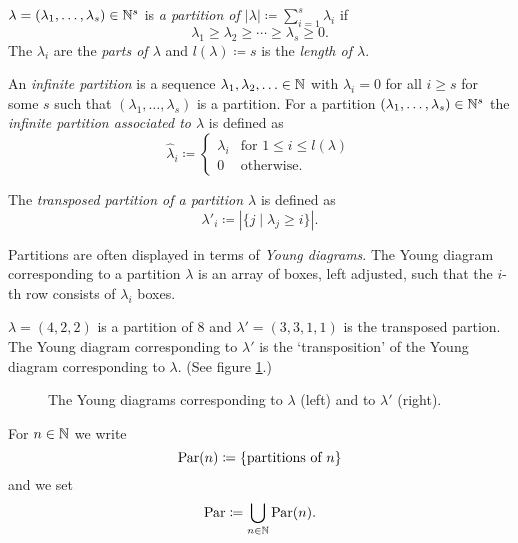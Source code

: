 \begin{defi}
  $\lambda = (\lambda_1, \dotsc, \lambda_s) \in \mathbb{N}^s$ is \emph{a partition of $|\lambda| \coloneqq \sum_{i=1}^s \lambda_i$} if
  \[
          \lambda_1
    \geq  \lambda_2
    \geq  \dotsb
    \geq  \lambda_s
    \geq  0.
  \]
  The $\lambda_i$ are the \emph{parts of $\lambda$} and $l(\lambda) \coloneqq s$ is the \emph{length of $\lambda$}.
  
  An \emph{infinite partition} is a sequence $\lambda_1, \lambda_2, \dotsc \in \mathbb{N}$ with $\lambda_i = 0$ for all $i \geq s$ for some $s$ such that $(\lambda_1, \dotsc, \lambda_s)$ is a partition.
  For a partition $(\lambda_1, \dotsc, \lambda_s) \in \mathbb{N}^s$ the \emph{infinite partition associated to $\lambda$} is defined as
  \[
              \hat{\lambda}_i
    \coloneqq \begin{cases}
                \lambda_i & \text{for } 1 \leq i \leq l(\lambda) \\
                        0 & \text{otherwise}.
              \end{cases}
  \]
  
  The \emph{transposed partition of a partition $\lambda$} is defined as
  \[
              \lambda'_i
    \coloneqq |\{j \mid \lambda_j \geq i\}|.
  \]
\end{defi}


Partitions are often displayed in terms of \emph{Young diagrams}.
The Young diagram corresponding to a partition $\lambda$ is an array of boxes, left adjusted, such that the $i$-th row consists of $\lambda_i$ boxes.


\begin{expl}
  $\lambda = (4,2,2)$ is a partition of $8$ and $\lambda' = (3,3,1,1)$ is the transposed partion.
  The Young diagram corresponding to $\lambda'$ is the `transposition' of the Young diagram corresponding to $\lambda$.
  (See figure \ref{fig: Young diagram example}.)
  \begin{figure}
    \centering
    \qquad
    \caption{The Young diagrams corresponding to $\lambda$ (left) and to $\lambda'$ (right).}
    \label{fig: Young diagram example}
  \end{figure}
\end{expl}


\begin{defi}
  For $n \in \mathbb{N}$ we write
  \[
              \operatorname{Par}(n)
    \coloneqq \{\text{partitions of $n$}\}
  \]
  and we set
  \[
              \operatorname{Par}
    \coloneqq \bigcup_{n \in \mathbb{N}} \operatorname{Par}(n).
  \]
\end{defi}
  

